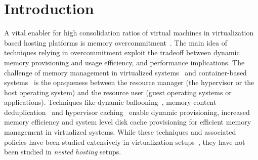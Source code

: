 \section{Introduction}
\label{sec:intro}

A vital enabler for high consolidation ratios of virtual machines
in virtualization based hosting platforms
is memory overcommitment~\cite{vmware,vmware:memory}. 
%
The main idea of techniques relying in overcommitment 
exploit the tradeoff between
dynamic memory provisioning and usage efficiency, and 
performance implications.
%
%
%
%
The challenge of memory management in virtualized systems~\cite{xen,kvm,vmware}
and container-based systems~\cite{cgroup,docker,lxc} is 
the opaqueness between the resource manager (the hypervisor or
the host operating system) and the resource user (guest operating
systems or applications).
%
%
Techniques like dynamic ballooning~\cite{vmware,hotplug}, memory
content deduplication~\cite{vmware,ksmpaper} and hypervisor 
caching~\cite{memtrans,oracletmem,kvmzcache} 
enable dynamic provisioning, increased memory efficiency and 
system level disk cache provisioning for efficient memory 
management in virtualized systems.
%
While these techniques and associated policies have been studied
extensively in virtualization setups~\cite{vmware, membal, membud, kvmzcache, tws},
they have not been studied in \emph{nested hosting} setups.

